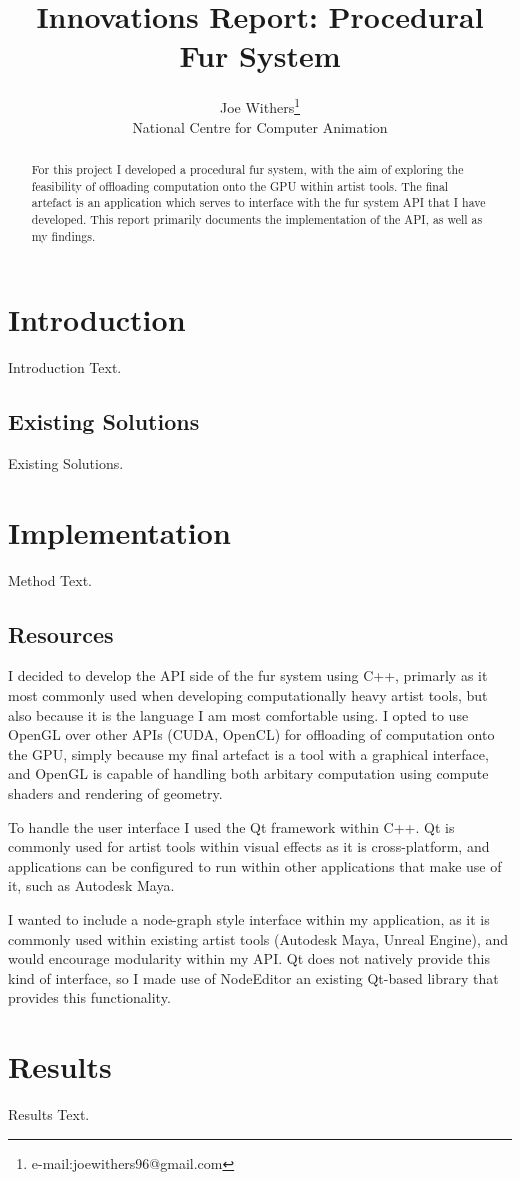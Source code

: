 \documentclass[]{acmsiggraph}
\title{Innovations Report: Procedural Fur System}
\author{Joe Withers\thanks{e-mail:joewithers96@gmail.com}\\National Centre for Computer Animation}
\begin{document}
\maketitle

\begin{abstract}
For this project I developed a procedural fur system, with the aim of exploring the feasibility of offloading computation onto the GPU within artist tools. The final artefact is an application which serves to interface with the fur system API that I have developed. This report primarily documents the implementation of the API, as well as my findings.
\end{abstract}

\section{Introduction} \label{sec:introduction}
Introduction Text.

\subsection{Existing Solutions} \label{sec:existing}
Existing Solutions.

\section{Implementation} \label{sec:implementation}
Method Text.

\subsection{Resources} \label{sec:resources}
I decided to develop the API side of the fur system using C++, primarly as it most commonly used when developing computationally heavy artist tools, but also because it is the language I am most comfortable using. I opted to use OpenGL over other APIs (CUDA, OpenCL) for offloading of computation onto the GPU, simply because my final artefact is a tool with a graphical interface, and OpenGL is capable of handling both arbitary computation using compute shaders and rendering of geometry.

To handle the user interface I used the Qt framework within C++. Qt is commonly used for artist tools within visual effects as it is cross-platform, and applications can be configured to run within other applications that make use of it, such as Autodesk Maya.

I wanted to include a node-graph style interface within my application, as it is commonly used within existing artist tools (Autodesk Maya, Unreal Engine), and would encourage modularity within my API. Qt does not natively provide this kind of interface, so I made use of NodeEditor \cite{Pinaev2017} an existing Qt-based library that provides this functionality.

\section{Results} \label{sec:results}
Results Text.



\end{document}

